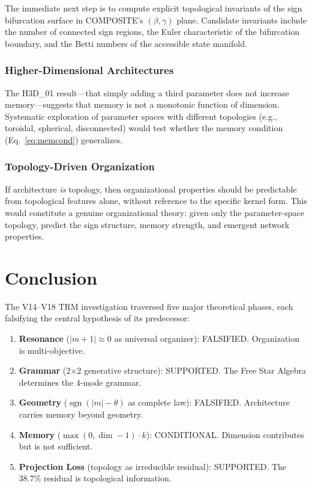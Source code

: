 \documentclass[11pt,a4paper,oneside]{report}
\newcommand{\supported}{\textcolor{supported}{SUPPORTED}}
\newcommand{\conditional}{\textcolor{conditional}{CONDITIONAL}}
\newcommand{\falsified}{\textcolor{falsified}{FALSIFIED}}
\DeclareMathOperator{\sgn}{sgn}
\begin{document}
The immediate next step is to compute explicit topological invariants of the
sign bifurcation surface in COMPOSITE's $(\beta, \gamma)$ plane. Candidate
invariants include the number of connected sign regions, the Euler
characteristic of the bifurcation boundary, and the Betti numbers of the
accessible state manifold.

\subsection{Higher-Dimensional Architectures}

The H3D\_01 result---that simply adding a third parameter does not increase
memory---suggests that memory is not a monotonic function of dimension.
Systematic exploration of parameter spaces with different topologies
(e.g., toroidal, spherical, disconnected) would test whether the memory
condition (Eq.~\ref{eq:memcond}) generalizes.

\subsection{Topology-Driven Organization}

If architecture \textit{is} topology, then organizational properties should
be predictable from topological features alone, without reference to the
specific kernel form. This would constitute a genuine organizational theory:
given only the parameter-space topology, predict the sign structure, memory
strength, and emergent network properties.

\chapter{Conclusion}

The V14--V18 TRM investigation traversed five major theoretical phases,
each falsifying the central hypothesis of its predecessor:

\begin{enumerate}[nosep]
  \item \textbf{Resonance} ($|m+1|\approx 0$ as universal organizer):
    \falsified{}. Organization is multi-objective.
  \item \textbf{Grammar} (2$\times$2 generative structure): \supported{}.
    The Free Star Algebra determines the 4-mode grammar.
  \item \textbf{Geometry} ($\sgn(|m|-\theta)$ as complete law): \falsified{}.
    Architecture carries memory beyond geometry.
  \item \textbf{Memory} ($\max(0, \dim-1)\cdot k$): \conditional{}.
    Dimension contributes but is not sufficient.
  \item \textbf{Projection Loss} (topology as irreducible residual):
    \supported{}. The 38.7\% residual is topological information.
\end{enumerate}
\end{document}
